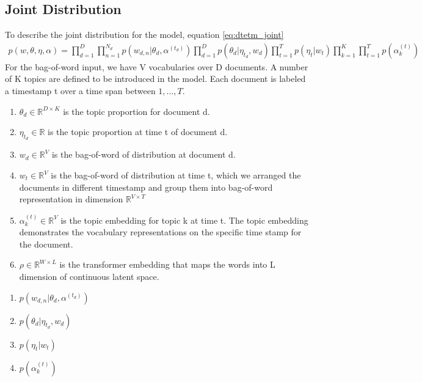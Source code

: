 \subsection{Joint Distribution}
To describe the joint distribution for the model, equation \ref{eq:dtetm_joint}
\begin{align}\label{eq:dtetm_joint}
p(w,\theta,\eta,\alpha)=\prod_{d=1}^{D}\prod_{n=1}^{N_d}p(w_{d,n}|\theta_d,\alpha^{(t_d)})\prod_{d=1}^{D}p(\theta_d|\eta_{t_d},w_d)\prod_{t=1}^{T}p(\eta_t|w_t)\prod_{k=1}^{K}\prod_{t=1}^{T}p(\alpha_k^{(t)})
\end{align}
For the bag-of-word input, we have V vocabularies over D documents. A number of K topics are defined to be introduced in the model. Each document is labeled a timestamp t over a time span between $ 1,\dots,T $.
\begin{enumerate}
\item $\theta_d\in\mathbb{R}^{D\times K}$ is the topic proportion for document d.
\item $\eta_{t_d}\in\mathbb{R}$ is the topic proportion at time t of document d.	
\item $ w_d \in\mathbb{R}^{V}$ is the bag-of-word of distribution at document d.
\item $ w_t \in\mathbb{R}^{V}$ is the bag-of-word of distribution at time t, which we arranged the documents in different timestamp and group them into bag-of-word representation in dimension $ \mathbb{R}^{V\times T} $
\item $\alpha_k^{(t)}\in\mathbb{R}^{V}$ is the topic embedding for topic k at time t. The topic embedding demonstrates the vocabulary representations on the specific time stamp for the document.
\item $ \rho\in\mathbb{R}^{W\times L} $ is the transformer embedding that maps the words into L dimension of continuous latent space. 
\end{enumerate}
\begin{enumerate}
\item $ p(w_{d,n}|\theta_d,\alpha^{(t_d)}) $
\item $ p(\theta_d|\eta_{t_d},w_d) $
\item $ p(\eta_t|w_t) $
\item $ p(\alpha_k^{(t)}) $
\end{enumerate}